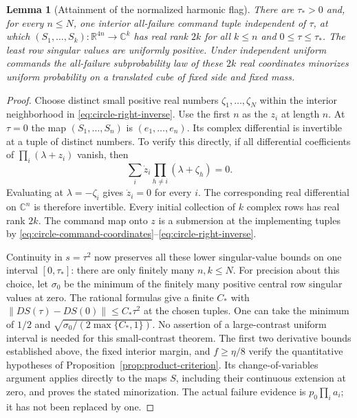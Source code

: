 \documentclass[11pt]{amsart}
\newtheorem{lemma}[theorem]{Lemma}
\theoremstyle{definition}\newtheorem{definition}[theorem]{Definition}
\theoremstyle{remark}\newtheorem{remark}[theorem]{Remark}
\newcommand{\R}{\mathbb R}\newcommand{\N}{\mathbb N}\newcommand{\C}{\mathbb C}
\begin{document}
\begin{lemma}[Attainment of the normalized harmonic flag]
\label{lem:circle-attainment}
There are $\tau_*>0$ and, for every $n\le N$, one interior
all-failure command tuple independent of $\tau$, at which
$(S_1,\ldots,S_k):\R^{4n}\to\C^k$ has real rank $2k$ for all
$k\le n$ and $0\le\tau\le\tau_*$. The least row singular values
are uniformly positive. Under independent uniform commands the
all-failure subprobability law of these $2k$ real coordinates minorizes
uniform probability on a translated cube of fixed side and fixed mass.
\end{lemma}
\begin{proof}
Choose distinct small positive real numbers $\zeta_1,\ldots,\zeta_N$
within the interior neighborhood in \eqref{eq:circle-right-inverse}.
Use the first $n$ as the $z_i$ at length $n$. At $\tau=0$ the map
$(S_1,\ldots,S_n)$ is $(e_1,\ldots,e_n)$. Its complex differential
is invertible at a tuple of distinct numbers. To verify this directly,
if all differential coefficients of $\prod_i(\lambda+z_i)$ vanish,
then
\[
 \sum_i \dot z_i\prod_{h\ne i}(\lambda+\zeta_h)=0.
\]
Evaluating at $\lambda=-\zeta_i$ gives $\dot z_i=0$ for every $i$.
The corresponding real differential on $\C^n$ is therefore invertible.
Every initial collection of $k$ complex rows has real rank $2k$.
The command map onto $z$ is a submersion at the implementing tuples by
\eqref{eq:circle-command-coordinates}--\eqref{eq:circle-right-inverse}.

Continuity in $s=\tau^2$ now preserves all these lower singular-value
bounds on one interval $[0,\tau_*]$: there are only finitely many
$n,k\le N$. For precision about this choice, let $\sigma_0$ be the
minimum of the finitely many positive central row singular values at
zero. The rational formulas give a finite $C_*$ with
$\|D S(\tau)-D S(0)\|\le C_*\tau^2$ at the chosen tuples.
One can take the minimum of $1/2$ and
$\sqrt{\sigma_0/(2\max\{C_*,1\})}$. No assertion of a large-contrast
uniform interval is needed for this small-contrast theorem.
The first two derivative bounds established above, the fixed interior
margin, and $f\ge\eta/8$ verify the quantitative hypotheses of
Proposition~\ref{prop:product-criterion}. Its change-of-variables
argument applies directly to the maps $S$, including their continuous
extension at zero, and proves the stated minorization. The actual
failure evidence is $p_0\prod_i a_i$; it has not been replaced by one.
\end{proof}
\end{document}
